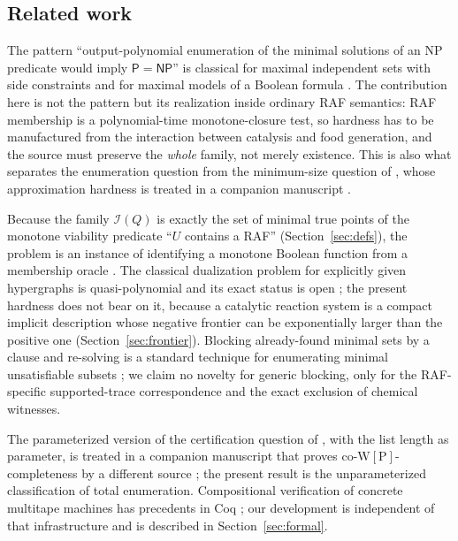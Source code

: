 \documentclass[11pt,a4paper]{article}
\theoremstyle{plain}
\theoremstyle{definition}
\theoremstyle{remark}
\newcommand{\Irr}{\mathcal I}
\newcommand{\PP}{\mathsf P}
\newcommand{\NP}{\mathsf{NP}}
\begin{document}
\subsection{Related work}

The pattern ``output-polynomial enumeration of the minimal solutions of an NP predicate would imply $\PP=\NP$'' is classical for maximal independent sets with side constraints \cite{lawler1980generating,johnson1988generating} and for maximal models of a Boolean formula \cite{kavvadias2000generating}. The contribution here is not the pattern but its realization inside ordinary RAF semantics: RAF membership is a polynomial-time monotone-closure test, so hardness has to be manufactured from the interaction between catalysis and food generation, and the source must preserve the \emph{whole} family, not merely existence. This is also what separates the enumeration question from the minimum-size question of \cite{steel2013minimal}, whose approximation hardness is treated in a companion manuscript \cite{minraf2026}.

Because the family $\Irr(Q)$ is exactly the set of minimal true points of the monotone viability predicate ``$U$ contains a RAF'' (Section~\ref{sec:defs}), the problem is an instance of identifying a monotone Boolean function from a membership oracle \cite{bioch1995complexity}. The classical dualization problem for explicitly given hypergraphs is quasi-polynomial \cite{fredman1996complexity,eiter1995identifying} and its exact status is open \cite{mary2024enumeration}; the present hardness does not bear on it, because a catalytic reaction system is a compact implicit description whose negative frontier can be exponentially larger than the positive one (Section~\ref{sec:frontier}). Blocking already-found minimal sets by a clause and re-solving is a standard technique for enumerating minimal unsatisfiable subsets \cite{liffiton2016fast}; we claim no novelty for generic blocking, only for the RAF-specific supported-trace correspondence and the exact exclusion of chemical witnesses.

The parameterized version of the certification question of \cite{steel2013minimal}, with the list length as parameter, is treated in a companion manuscript that proves co-$\mathrm{W[P]}$-completeness by a different source \cite{certification2026}; the present result is the unparameterized classification of total enumeration. Compositional verification of concrete multitape machines has precedents in Coq \cite{forster2020verified}; our development is independent of that infrastructure and is described in Section~\ref{sec:formal}.
\end{document}
